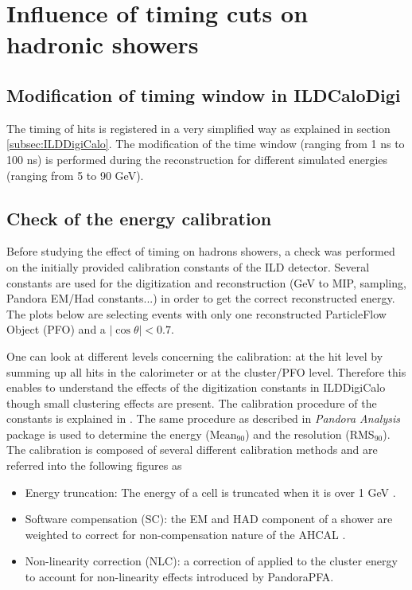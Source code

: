 \section{Influence of timing cuts on hadronic showers}
\label{sec:ILDTiming}

\subsection{Modification of timing window in ILDCaloDigi}

The timing of hits is registered in a very simplified way as explained in section \ref{subsec:ILDDigiCalo}. The modification of the time window (ranging from 1 ns to 100 ns) is performed during the reconstruction for different simulated \kzeroL{} energies (ranging from 5 to 90 GeV).

\subsection{Check of the energy calibration}

Before studying the effect of timing on hadrons showers, a check was performed on the initially provided calibration constants of the ILD detector. Several constants are used for the digitization and reconstruction (GeV to MIP, sampling, Pandora EM/Had constants...) in order to get the correct reconstructed energy. The plots below are selecting events with only one reconstructed ParticleFlow Object (PFO) and a $|\cos\theta| < 0.7$.

One can look at different levels concerning the calibration: at the hit level by summing up all hits in the calorimeter or at the cluster/PFO level. Therefore this enables to understand the effects of the digitization constants in ILDDigiCalo though small clustering effects are present. The calibration procedure of the constants is explained in \cite{PandoraCalib}. The same procedure as described in \textit{Pandora Analysis} package is used to determine the energy (Mean$_{90}$) and the resolution (RMS$_{90}$). The calibration is composed of several different calibration methods and are referred into the following figures as
\begin{itemize}
  \item Energy truncation: The energy of a cell is truncated when it is over 1 GeV \cite{Tran:2017tgr}.
  \item Software compensation (SC): the EM and HAD component of a shower are weighted to correct for non-compensation nature of the AHCAL \cite{Tran:2017tgr}.
  \item Non-linearity correction (NLC): a correction of applied to the cluster energy to account for non-linearity effects introduced by PandoraPFA.
\end{itemize}

